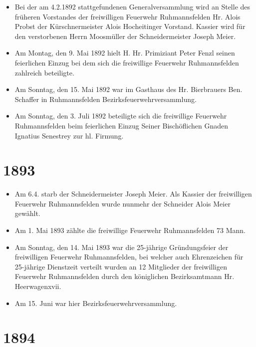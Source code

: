 \documentclass[12pt,a4paper]{book}
\begin{document}
\begin{itemize}
\item Bei der am 4.2.1892 stattgefundenen Generalversammlung wird an
Stelle des früheren Vorstandes der freiwilligen Feuerwehr Ruhmannsfelden
Hr. Alois Probst der Kürschnermeister Alois Hocheitinger Vorstand.
Kassier wird für den verstorbenen Herrn Moosmüller der Schneidermeister
Joseph Meier.

\item Am Montag, den 9. Mai 1892 hielt H. Hr. Primiziant Peter Fenzl
seinen feierlichen Einzug bei dem sich die freiwillige Feuerwehr
Ruhmannsfelden zahlreich beteiligte.

\item Am Sonntag, den 15. Mai 1892 war im Gasthaus des Hr. Bierbrauers
Ben. Schaffer in Ruhmannsfelden Bezirksfeuerwehrversammlung.

\item Am Sonntag, den 3. Juli 1892 beteiligte sich die freiwillige
Feuerwehr Ruhmannsfelden beim feierlichen Einzug Seiner Bischöflichen
Gnaden Ignatius Senestrey zur hl. Firmung.
\end{itemize}

\section*{1893}

\begin{itemize}
\item Am 6.4. starb der Schneidermeister Joseph Meier. Als Kassier der
freiwilligen Feuerwehr Ruhmannsfelden wurde nunmehr der Schneider Alois
Meier gewählt.

\item Am 1. Mai 1893 zählte die freiwillige Feuerwehr Ruhmannsfelden 73
Mann.

\item Am Sonntag, den 14. Mai 1893 war die 25-jährige Gründungsfeier der
freiwilligen Feuerwehr Ruhmannsfelden, bei welcher auch Ehrenzeichen für
25-jährige Dienstzeit verteilt wurden an 12 Mitglieder der freiwilligen
Feuerwehr Ruhmannsfelden durch den königlichen Bezirksamtmann Hr.
Heerwagenxvii.

\item Am 15. Juni war hier Bezirksfeuerwehrversammlung.
\end{itemize}

\section*{1894}
\end{document}
